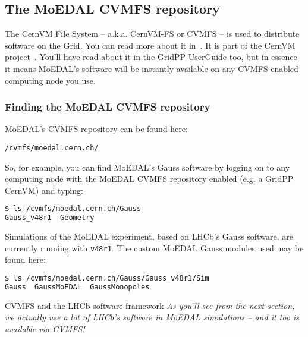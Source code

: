 \subsection{The MoEDAL CVMFS repository}
\label{sec:cvmfs}
The CernVM File System -- a.k.a. CernVM-FS or \acs{CVMFS} -- is used to
distribute software on the Grid.  You can read more about it
in~\cite{CVMFS2015}.  It is part of the CernVM project~\cite{CernVM2015}.
You'll have read about it in the GridPP UserGuide too, but in essence it means
\ac{MoEDAL}'s software will be instantly available on any
\ac{CVMFS}-enabled computing node you use.

\subsubsection{Finding the MoEDAL CVMFS repository}
\label{sec:moedalcvmfsfinding}

MoEDAL's \ac{CVMFS} repository can be found here:

\texttt{/cvmfs/moedal.cern.ch/}

So, for example, you can find MoEDAL's Gauss software by logging on to
any computing node with the MoEDAL \ac{CVMFS} repository enabled
(e.g. a GridPP CernVM) and typing:

\begin{lstlisting}[gobble=0,numbers=none,language=bash]
$ ls /cvmfs/moedal.cern.ch/Gauss
Gauss_v48r1  Geometry
\end{lstlisting}

Simulations of the MoEDAL experiment, based on \ac{LHCb}'s Gauss
software, are currently running with \texttt{v48r1}.
The custom MoEDAL Gauss modules used may be found here:

\begin{lstlisting}[gobble=0,numbers=none,language=bash]
$ ls /cvmfs/moedal.cern.ch/Gauss/Gauss_v48r1/Sim
Gauss  GaussMoEDAL  GaussMonopoles
\end{lstlisting}

\begin{infobox}{CVMFS and the LHCb software framework}
\emph{As you'll see from the next section, we actually use a lot
of \ac{LHCb}'s software in \ac{MoEDAL} simulations -- and it too
is available via \ac{CVMFS}!}
\end{infobox}

